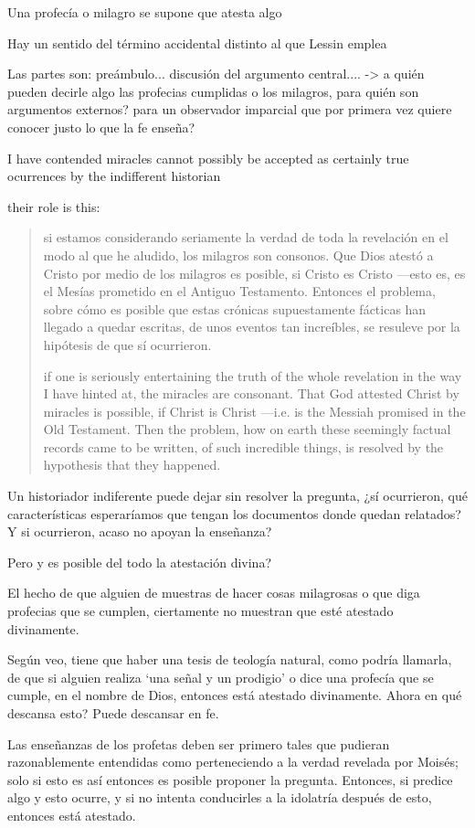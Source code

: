 Una profecía o milagro se supone que atesta algo

Hay un sentido del término accidental distinto al que Lessin emplea

Las partes son: preámbulo...
discusión del argumento central....
-> a quién pueden decirle algo las profecias cumplidas o los milagros, para
quién son argumentos externos? para un observador imparcial que por primera vez
quiere conocer justo lo que la fe enseña?

I have contended miracles cannot possibly be accepted as certainly true
ocurrences by the indifferent historian

their role is this: \blockquote[if one is seriously entertaining the truth of
the whole revelation in the way I have hinted at, the miracles are consonant.
That God attested Christ by miracles is possible, if Christ is Christ ---i.e. is
the Messiah promised in the Old Testament. Then the problem, how on earth these
seemingly factual records came to be written, of such incredible things, is
resolved by the hypothesis that they happened.]{si estamos considerando
  seriamente la verdad de toda la revelación en el modo al que he aludido, los
  milagros son consonos. Que Dios atestó a Cristo por medio de los milagros es
  posible, si Cristo es Cristo ---esto es, es el Mesías prometido en el Antiguo
  Testamento. Entonces el problema, sobre cómo es posible que estas crónicas
  supuestamente fácticas han llegado a quedar escritas, de unos eventos tan
  increíbles, se resuleve por la hipótesis de que sí ocurrieron.}

Un historiador indiferente puede dejar sin resolver la pregunta, ¿sí ocurrieron,
qué características esperaríamos que tengan los documentos donde quedan
relatados? Y si ocurrieron, acaso no apoyan la enseñanza?

Pero y es posible del todo la atestación divina?

El hecho de que alguien de muestras de hacer cosas milagrosas o que diga
profecias que se cumplen, ciertamente no muestran que esté atestado divinamente.

Según veo, tiene que haber una tesis de teología natural, como podría llamarla,
de que si alguien realiza `una señal y un prodigio' o dice una profecía que se
cumple, en el nombre de Dios, entonces está atestado divinamente. Ahora en qué
descansa esto? Puede descansar en fe.

Las enseñanzas de los profetas deben ser primero tales que pudieran
razonablemente entendidas como perteneciendo a la verdad revelada por Moisés;
solo si esto es así entonces es posible proponer la pregunta. Entonces, si
predice algo y esto ocurre, y si no intenta conducirles a la idolatría después
de esto, entonces está atestado.

